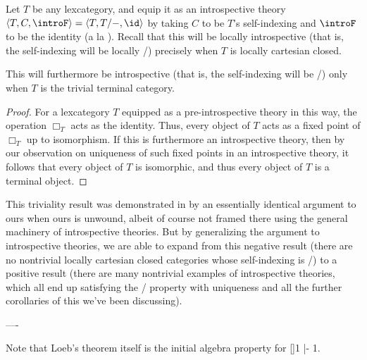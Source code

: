 \begin{theorem}\label{LocallyCartesianLoeb}
Let $T$ be any lexcategory, and equip it as an introspective theory $\langle T, C, \introF \rangle = \langle T, T/-, \id \rangle$ by taking $C$ to be $T$'s self-indexing and $\introF$ to be the identity (a la ). Recall that this will be locally introspective (that is, the self-indexing will be locally \repsmall/) precisely when $T$ is locally cartesian closed.

This will furthermore be introspective (that is, the self-indexing will be \repsmall/) only when $T$ is the trivial terminal category.
\end{theorem}
\begin{proof}
For a lexcategory $T$ equipped as a pre-introspective theory in this way, the operation $\Box_T$ acts as the identity. Thus, every object of $T$ acts as a fixed point of $\Box_T$ up to isomorphism. If this is furthermore an introspective theory, then by our observation on uniqueness of such fixed points in an introspective theory, it follows that every object of $T$ is isomorphic, and thus every object of $T$ is a terminal object.
\end{proof}
This triviality result was demonstrated in \autocite{PittsTaylor1989} by an essentially identical argument to ours when ours is unwound, albeit of course not framed there using the general machinery of introspective theories. But by generalizing the argument to introspective theories, we are able to expand from this negative result (there are no nontrivial locally cartesian closed categories whose self-indexing is \repsmall/) to a positive result (there are many nontrivial examples of introspective theories, which all end up satisfying the \Loeb/ property with uniqueness and all the further corollaries of this we've been discussing).

----


\begin{TODOblock}
Note that Loeb's theorem itself is the initial algebra property for []1 |- 1.
\end{TODOblock}

